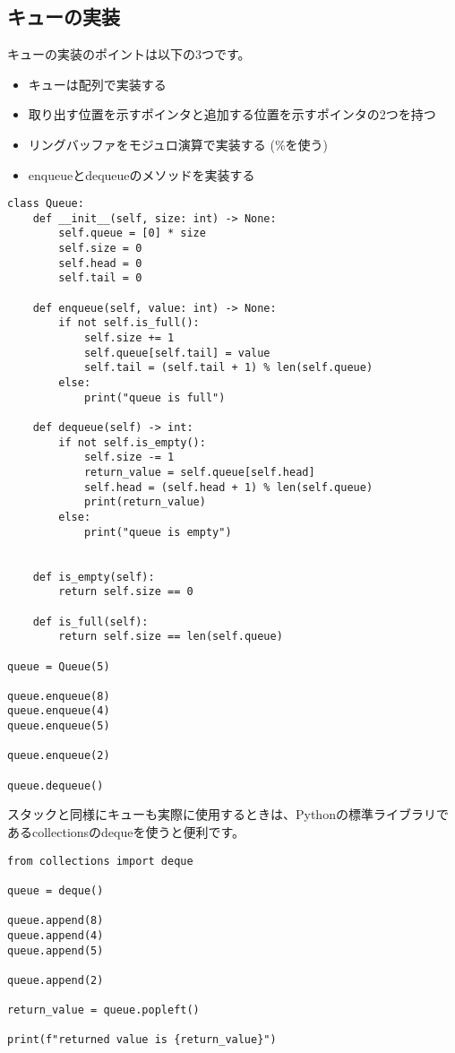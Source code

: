 \subsection{キューの実装}
キューの実装のポイントは以下の3つです。
\begin{itemize}
	\item キューは配列で実装する
	\item 取り出す位置を示すポインタと追加する位置を示すポインタの2つを持つ
	\item リングバッファをモジュロ演算で実装する (\%を使う)
	\item enqueueとdequeueのメソッドを実装する
\end{itemize}

\begin{lstlisting}[caption=キューの実装, frame=TRBL, label={queue}]
	class Queue:
    def __init__(self, size: int) -> None:
        self.queue = [0] * size
        self.size = 0
        self.head = 0
        self.tail = 0
        
    def enqueue(self, value: int) -> None:
        if not self.is_full():
            self.size += 1
            self.queue[self.tail] = value
            self.tail = (self.tail + 1) % len(self.queue)
        else:
            print("queue is full")
    
    def dequeue(self) -> int:
        if not self.is_empty():
            self.size -= 1
            return_value = self.queue[self.head]
            self.head = (self.head + 1) % len(self.queue)
            print(return_value)
        else:
            print("queue is empty")
        
    
    def is_empty(self):
        return self.size == 0

    def is_full(self):
        return self.size == len(self.queue)

queue = Queue(5)

queue.enqueue(8)
queue.enqueue(4)
queue.enqueue(5)

queue.enqueue(2)

queue.dequeue()

\end{lstlisting}

\begin{tcolorbox}[enhanced, title=Column2 collections.deque, breakable, colback=white, drop fuzzy shadow, attach boxed title to top center={yshift*=0.1cm}]
	スタックと同様にキューも実際に使用するときは、Pythonの標準ライブラリであるcollectionsのdequeを使うと便利です。
	
	\begin{lstlisting}[frame=TRBL]
		from collections import deque

queue = deque()

queue.append(8)
queue.append(4)
queue.append(5)

queue.append(2)

return_value = queue.popleft()

print(f"returned value is {return_value}")
	\end{lstlisting}
\end{tcolorbox}

